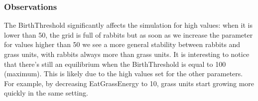 \documentclass[11pt]{article}
\begin{document}
\subsubsection{Observations}
The BirthThreshold significantly affects the simulation for high values: when it is lower than 50, the grid is full of rabbits but as soon as we increase the parameter for values higher than 50 we see a more general stability between rabbits and grass units, with rabbits always more than grass units. It is interesting to notice that there's still an equilibrium when the BirthThreshold is equal to 100 (maximum). This is likely due to the high values set for the other parameters. For example, by decreasing EatGrassEnergy to 10, grass units start growing more quickly in the same setting. 
\end{document}
